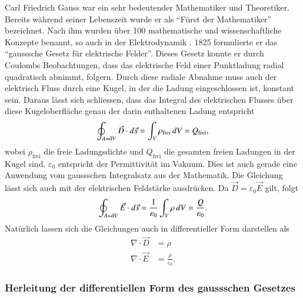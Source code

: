 Carl Friedrich Gauss war ein sehr bedeutender Mathematiker und Theoretiker.
Bereits während seiner Lebenszeit wurde er als ``Fürst der Mathematiker'' bezeichnet.
Nach ihm wurden über 100 mathematische und wissenschaftliche Konzepte benannt, so auch in der Elektrodynamik \cite{maxwell:Carl_Friedrich_Gauß}.
1825 formulierte er das ``gausssche Gesetz für elektrische Felder''.
Dieses Gesetz konnte er durch Coulombs Beobachtungen, dass das elektrische Feld einer Punktladung radial quadratisch abnimmt, folgern.
Durch diese radiale Abnahme muss auch der elektrisch Fluss durch eine Kugel, in der die Ladung eingeschlossen ist, konstant sein.
Daraus lässt sich schliessen, dass das Integral des elektrischen Flusses über diese Kugeloberfläche genau der darin enthaltenen Ladung entspricht \cite{maxwell:Gaußscher_Integralsatz}
\begin{equation}
\label{maxwell:equasion:elektrisch}
\oint_{A=\d V} \vec{D} \cdot d\vec{s}
=
\int_{V} \rho_{\text{frei}}\, dV
=
Q_{\text{frei}} ,
\end{equation}
wobei $\rho_{\text{frei}}$ die freie Ladungsdichte und $Q_{\text{frei}}$ die gesamten freien Ladungen in der Kugel sind. $\varepsilon_0$ entspricht der Permittivität im Vakuum. Dies ist auch gerade eine Anwendung vom gaussschen Integralsatz aus der Mathematik.
Die Gleichung lässt sich auch mit der elektrischen Feldstärke ausdrücken. Da $\vec{D} = \varepsilon_0 \vec{E}$ gilt, folgt
\[
\oint_{A=\d V} \vec{E} \cdot d\vec{s}
=
\frac{1}{\varepsilon_0}\int_{V} \rho\, dV
=
\frac{Q}{\varepsilon_0} .
\]
Natürlich lassen sich die Gleichungen auch in differentieller Form darstellen als
\begin{align*}
	\nabla \cdot \vec{D}
	&=
	\rho
	\\
	\nabla \cdot \vec{E}
	&=
	\frac{\rho}{\varepsilon_0} .
\end{align*}

\subsubsection{Herleitung der differentiellen Form des gaussschen Gesetzes}

